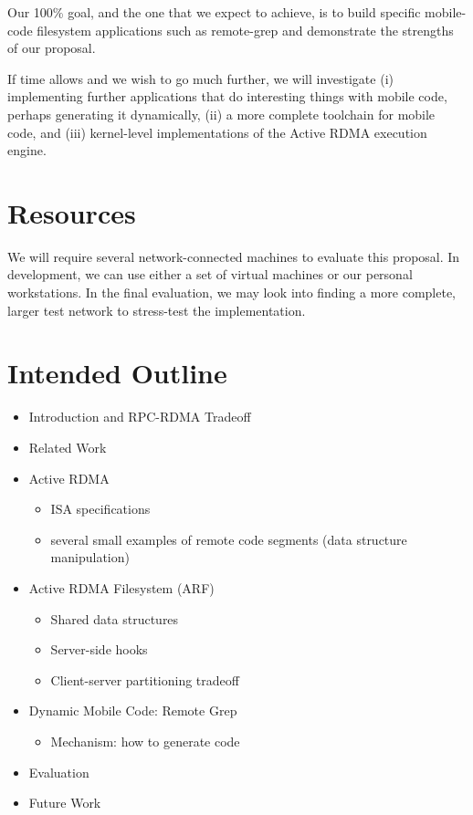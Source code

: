 \documentclass[10pt]{article}
\begin{document}
Our 100\% goal, and the one that we expect to achieve, is to build
specific mobile-code filesystem applications such as remote-grep and
demonstrate the strengths of our proposal.

If time allows and we wish to go much further, we will investigate (i)
implementing further applications that do interesting things with
mobile code, perhaps generating it dynamically, (ii) a more complete
toolchain for mobile code, and (iii) kernel-level implementations of
the Active RDMA execution engine.

\section{Resources}

We will require several network-connected machines to evaluate this
proposal. In development, we can use either a set of virtual machines
or our personal workstations. In the final evaluation, we may look
into finding a more complete, larger test network to stress-test the
implementation.

\section{Intended Outline}

\begin{itemize}
\item Introduction and RPC-RDMA Tradeoff
\item Related Work
\item Active RDMA
  \begin{itemize}
  \item ISA specifications
  \item several small examples of remote code segments (data structure manipulation)
  \end{itemize}
\item Active RDMA Filesystem (ARF)
  \begin{itemize}
    \item Shared data structures
    \item Server-side hooks
    \item Client-server partitioning tradeoff
    \end{itemize}
\item Dynamic Mobile Code: Remote Grep
  \begin{itemize}
  \item Mechanism: how to generate code
  \end{itemize}
\item Evaluation
\item Future Work
\end{itemize}



\end{document}
